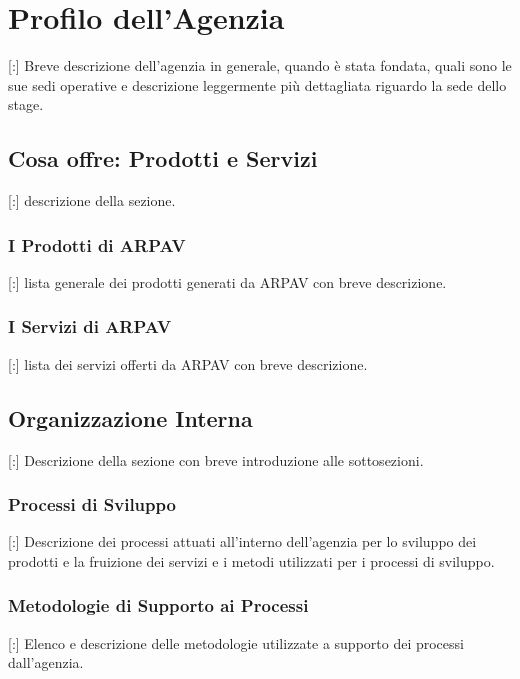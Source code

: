 \chapter{Profilo dell'Agenzia}
\label{1.0}
\thispagestyle{fancy} 

[:] Breve descrizione dell'agenzia in generale, quando è stata fondata, quali sono le sue sedi operative e descrizione leggermente più dettagliata riguardo la sede dello stage.

\section{Cosa offre: Prodotti e Servizi}

[:] descrizione della sezione.

\subsection{I Prodotti di ARPAV}

[:] lista generale dei prodotti generati da ARPAV con breve descrizione.

\subsection{I Servizi di ARPAV}

[:] lista dei servizi offerti da ARPAV con breve descrizione.

\section{Organizzazione Interna}

[:] Descrizione della sezione con breve introduzione alle sottosezioni.

\subsection{Processi di Sviluppo}

[:] Descrizione dei processi attuati all'interno dell'agenzia per lo sviluppo dei prodotti e la fruizione dei servizi e i metodi utilizzati per i processi di sviluppo.

\subsection{Metodologie di Supporto ai Processi}

[:] Elenco e descrizione delle metodologie utilizzate a supporto dei processi dall'agenzia.

